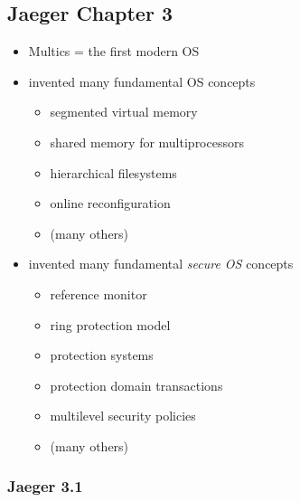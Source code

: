 \documentclass[
  12pt]{findlay}
\providecommand{\tightlist}{%
  \setlength{\itemsep}{0pt}\setlength{\parskip}{0pt}}
\begin{document}
\hypertarget{jaeger-chapter-3}{%
\subsection{Jaeger Chapter 3}\label{jaeger-chapter-3}}

\begin{itemize}
\tightlist
\item
  Multics = the first modern OS
\item
  invented many fundamental OS concepts

  \begin{itemize}
  \tightlist
  \item
    segmented virtual memory
  \item
    shared memory for multiprocessors
  \item
    hierarchical filesystems
  \item
    online reconfiguration
  \item
    (many others)
  \end{itemize}
\item
  invented many fundamental \emph{secure OS} concepts

  \begin{itemize}
  \tightlist
  \item
    reference monitor
  \item
    ring protection model
  \item
    protection systems
  \item
    protection domain transactions
  \item
    multilevel security policies
  \item
    (many others)
  \end{itemize}
\end{itemize}

\hypertarget{jaeger-3.1}{%
\subsubsection{Jaeger 3.1}\label{jaeger-3.1}}
\end{document}
